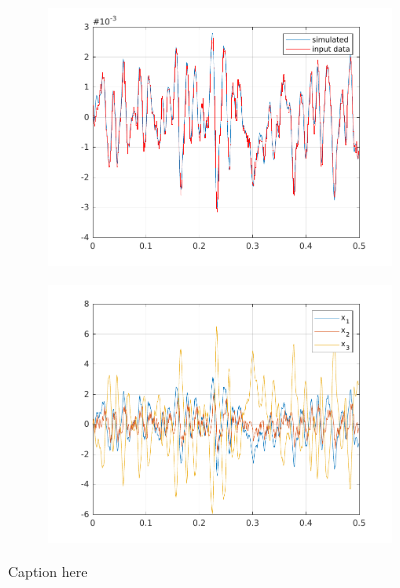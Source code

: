 \begin{figure}[h]
	\begin{subfigure}{0.49\textwidth}
		\includegraphics[width=\textwidth]{figures/ss_id_output.pdf}	
	\end{subfigure}
	\begin{subfigure}{0.49\textwidth}
		\includegraphics[width=\textwidth]{figures/ss_id_states.pdf}	
	\end{subfigure}
	\caption{Caption here}
	\label{fig:figure1}
\end{figure}
